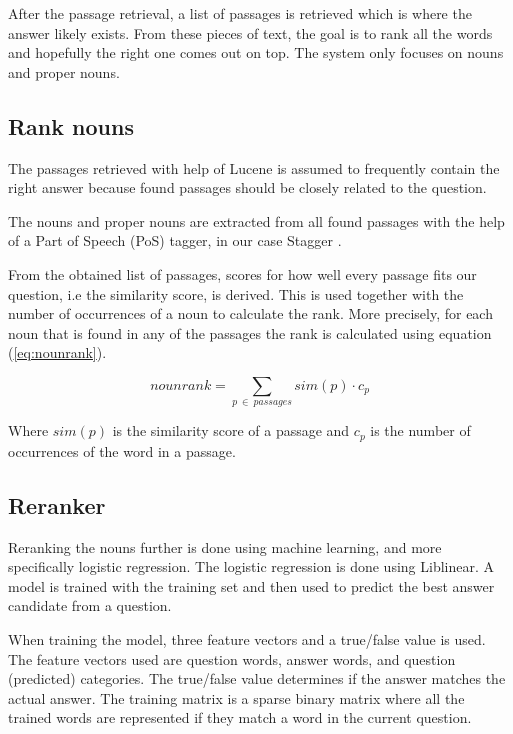 After the passage retrieval, a list of passages is retrieved which is where the answer likely exists. 
From these pieces of text, the goal is to rank all the words and hopefully the right one comes out on top.
The system only focuses on nouns and proper nouns.

\subsection{Rank nouns}

The passages retrieved with help of Lucene is assumed to frequently contain the right answer
because found passages should be closely related to the question.

The nouns and proper nouns are extracted from all found passages with the help of a Part of Speech (PoS) 
tagger, in our case Stagger \cite{stagger}.

From the obtained list of passages, scores for how well every passage fits our question, i.e the similarity score, is derived.
This is used together with the number of occurrences of a noun to calculate the rank.
More precisely, for each noun that is found in any of the passages the rank is calculated using equation (\ref{eq:nounrank}).

\begin{equation}
nounrank = \sum_{p\:\in\:passages}sim(p) \cdot c_p
\label{eq:nounrank}
\end{equation}

Where $sim(p)$ is the similarity score of a passage and $c_p$ is the number of occurrences of the word in a passage.

\subsection{Reranker}

Reranking the nouns further is done using machine learning, and more specifically logistic regression.
The logistic regression is done using Liblinear. \cite{liblinear}
A model is trained with the training set and then used to predict the best answer candidate from a question.

When training the model, three feature vectors and a true/false value is used. 
The feature vectors used are question words, answer words, and question (predicted) categories. The true/false
value determines if the answer matches the actual answer. The training matrix is a sparse binary matrix where 
all the trained words are represented if they match a word in the current question.

